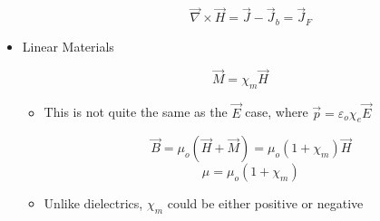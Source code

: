 \begin{itemize}
\begin{itemize}
        $$\vec{\nabla}\times\vec{H}=\vec{J}-\vec{J}_b=\vec{J}_F$$

    \end{itemize}

  \item Linear Materials

    $$\vec{M}=\chi_m\vec{H}$$

    \begin{itemize}

      \item This is not quite the same as the $\vec{E}$ case, where $\vec{p}=\varepsilon_o\chi_e\vec{E}$


        $$\vec{B}=\mu_o(\vec{H}+\vec{M})=\mu_o(1+\chi_m)\vec{H}$$
        $$\mu=\mu_o(1+\chi_m)$$

      \item Unlike dielectrics, $\chi_m$ could be either positive or negative
    \end{itemize}

\end{itemize}



